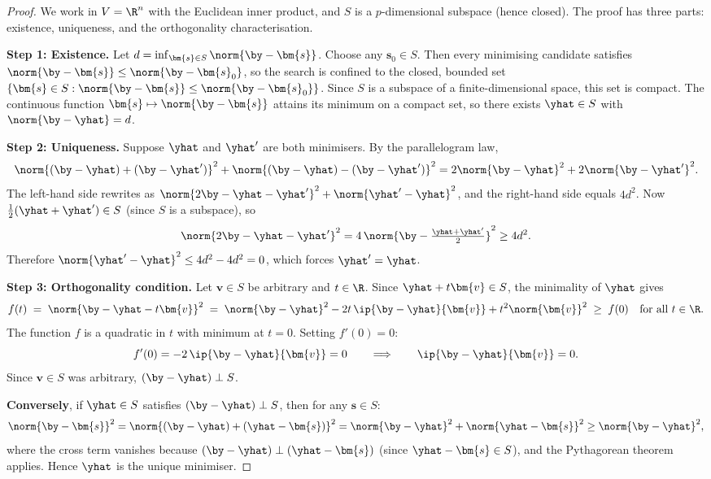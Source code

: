 \begin{proof}
We work in $V = \R^n$ with the Euclidean inner product, and $S$ is a
$p$-dimensional subspace (hence closed).  The proof has three parts:
existence, uniqueness, and the orthogonality characterisation.

\medskip
\noindent\textbf{Step 1: Existence.}
Let $d = \inf_{\bm{s}\in S}\norm{\by - \bm{s}}$.
Choose any $\bm{s}_0 \in S$. Then every minimising candidate satisfies
$\norm{\by - \bm{s}} \le \norm{\by - \bm{s}_0}$,
so the search is confined to the closed, bounded set
$\{\bm{s}\in S : \norm{\by - \bm{s}} \le \norm{\by - \bm{s}_0}\}$.
Since $S$ is a subspace of a finite-dimensional space, this set is compact.
The continuous function $\bm{s}\mapsto\norm{\by - \bm{s}}$ attains its
minimum on a compact set, so there exists $\yhat\in S$ with
$\norm{\by - \yhat} = d$.

\medskip
\noindent\textbf{Step 2: Uniqueness.}
Suppose $\yhat$ and $\yhat'$ are both minimisers.
By the parallelogram law,
\[
  \norm{(\by - \yhat) + (\by - \yhat')}^2
  + \norm{(\by - \yhat) - (\by - \yhat')}^2
  = 2\norm{\by - \yhat}^2 + 2\norm{\by - \yhat'}^2.
\]
The left-hand side rewrites as
$\norm{2\by - \yhat - \yhat'}^2 + \norm{\yhat' - \yhat}^2$,
and the right-hand side equals $4d^2$.
Now $\frac{1}{2}(\yhat + \yhat') \in S$ (since $S$ is a subspace), so
\[
  \norm{2\by - \yhat - \yhat'}^2
  = 4\,\norm{\by - \tfrac{\yhat+\yhat'}{2}}^2
  \ge 4d^2.
\]
Therefore $\norm{\yhat' - \yhat}^2 \le 4d^2 - 4d^2 = 0$,
which forces $\yhat' = \yhat$.

\medskip
\noindent\textbf{Step 3: Orthogonality condition.}
Let $\bm{v}\in S$ be arbitrary and $t\in\R$.
Since $\yhat + t\bm{v}\in S$, the minimality of $\yhat$ gives
\[
  f(t)
  \;=\; \norm{\by - \yhat - t\bm{v}}^2
  \;=\; \norm{\by - \yhat}^2
        - 2t\,\ip{\by - \yhat}{\bm{v}}
        + t^2\norm{\bm{v}}^2
  \;\ge\; f(0)
  \quad\text{for all } t\in\R.
\]
The function $f$ is a quadratic in $t$ with minimum at $t=0$.
Setting $f'(0) = 0$:
\[
  f'(0) = -2\,\ip{\by-\yhat}{\bm{v}} = 0
  \qquad\Longrightarrow\qquad
  \ip{\by - \yhat}{\bm{v}} = 0.
\]
Since $\bm{v}\in S$ was arbitrary, $(\by - \yhat)\perp S$.

\medskip
\noindent\textbf{Conversely}, if $\yhat\in S$ satisfies $(\by-\yhat)\perp S$,
then for any $\bm{s}\in S$:
\[
  \norm{\by - \bm{s}}^2
  = \norm{(\by - \yhat) + (\yhat - \bm{s})}^2
  = \norm{\by - \yhat}^2 + \norm{\yhat - \bm{s}}^2
  \ge \norm{\by - \yhat}^2,
\]
where the cross term vanishes because $(\by - \yhat)\perp(\yhat-\bm{s})$
(since $\yhat - \bm{s}\in S$), and the Pythagorean theorem applies.
Hence $\yhat$ is the unique minimiser.
\end{proof}


